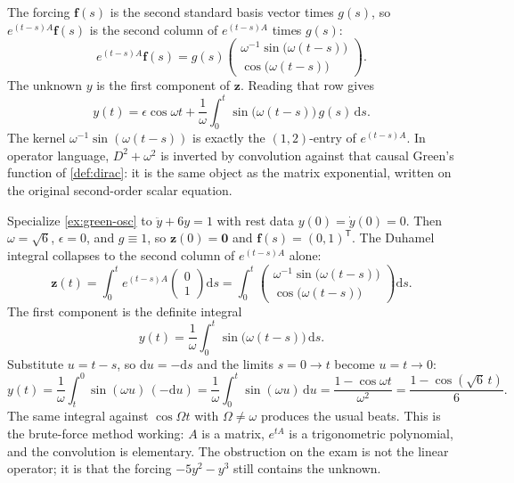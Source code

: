 \documentclass[11pt,a4paper]{article}
\begin{document}
\begin{example}
\[\]
The forcing \(\mathbf{f}(s)\) is the second standard basis vector times \(g(s)\), so \(e^{(t-s)A}\mathbf{f}(s)\) is the second column of \(e^{(t-s)A}\) times \(g(s)\):
\[
e^{(t-s)A}\mathbf{f}(s)
=
g(s)
\begin{pmatrix}
\omega^{-1}\sin\bigl(\omega(t-s)\bigr) \\
\cos\bigl(\omega(t-s)\bigr)
\end{pmatrix}.
\]
The unknown \(y\) is the first component of \(\mathbf{z}\). Reading that row gives
\begin{equation}
\label{eq:osc-duhamel}
y(t)
=
\epsilon\cos\omega t
+
\frac{1}{\omega}\int_{0}^{t}\sin\bigl(\omega(t-s)\bigr)\,g(s)\,\mathrm{d}s.
\end{equation}
The kernel \(\omega^{-1}\sin(\omega(t-s))\) is exactly the \((1,2)\)-entry of \(e^{(t-s)A}\). In operator language, \(D^{2}+\omega^{2}\) is inverted by convolution against that causal Green's function of \cref{def:dirac}: it is the same object as the matrix exponential, written on the original second-order scalar equation.
\end{example}

\begin{example}
\label{ex:duhamel-linear}
Specialize \cref{ex:green-osc} to \(\ddot y+6y=1\) with rest data \(y(0)=\dot y(0)=0\). Then \(\omega=\sqrt{6}\), \(\epsilon=0\), and \(g\equiv 1\), so \(\mathbf{z}(0)=\mathbf{0}\) and \(\mathbf{f}(s)=(0,1)^{\mathsf T}\). The Duhamel integral collapses to the second column of \(e^{(t-s)A}\) alone:
\[
\mathbf{z}(t)
=
\int_{0}^{t} e^{(t-s)A}
\begin{pmatrix} 0 \\ 1 \end{pmatrix}
\mathrm{d}s
=
\int_{0}^{t}
\begin{pmatrix}
\omega^{-1}\sin\bigl(\omega(t-s)\bigr) \\
\cos\bigl(\omega(t-s)\bigr)
\end{pmatrix}
\mathrm{d}s.
\]
The first component is the definite integral
\[
y(t)
=
\frac{1}{\omega}\int_{0}^{t}\sin\bigl(\omega(t-s)\bigr)\,\mathrm{d}s.
\]
Substitute \(u=t-s\), so \(\mathrm{d}u=-\mathrm{d}s\) and the limits \(s=0\to t\) become \(u=t\to 0\):
\[
y(t)
=
\frac{1}{\omega}\int_{t}^{0}\sin(\omega u)\,(-\mathrm{d}u)
=
\frac{1}{\omega}\int_{0}^{t}\sin(\omega u)\,\mathrm{d}u
=
\frac{1-\cos\omega t}{\omega^{2}}
=
\frac{1-\cos(\sqrt{6}\,t)}{6}.
\]
The same integral against \(\cos\Omega t\) with \(\Omega\neq\omega\) produces the usual beats. This is the brute-force method working: \(A\) is a matrix, \(e^{tA}\) is a trigonometric polynomial, and the convolution is elementary. The obstruction on the exam is not the linear operator; it is that the forcing \(-5y^{2}-y^{3}\) still contains the unknown.
\end{example}
\end{document}
